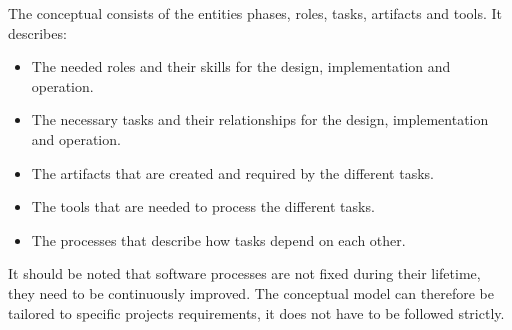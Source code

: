 The conceptual consists of the entities phases, roles, tasks, artifacts and tools. It describes:
\begin{itemize}
	\item The needed roles and their skills for the design, implementation and operation.
	\item The necessary tasks and their relationships for the design, implementation and operation.
	\item The artifacts that are created and required by the different tasks.
	\item The tools that are needed to process the different tasks.
	\item The processes that describe how tasks depend on each other.
\end{itemize}



It should be noted that software processes are not fixed during their lifetime, they need to be continuously improved. \citep{Fuggetta:2000ds}
The conceptual model can therefore be tailored to specific projects requirements, it does not have to be followed strictly.
